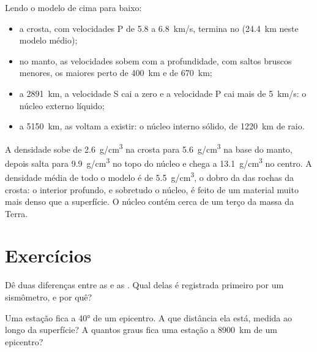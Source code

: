 Lendo o modelo de cima para baixo:
\begin{itemize}
  \item a crosta, com velocidades P de 5.8 a \qty{6.8}{km/s}, termina no
         (\qty{24.4}{km} neste modelo médio);
  \item no manto, as velocidades sobem com a profundidade, com saltos
        bruscos menores, os maiores perto de \qty{400}{km} e de
        \qty{670}{km};
  \item a \qty{2891}{km}, a velocidade S cai a zero e a velocidade P cai
        mais de \qty{5}{km/s}: o núcleo externo líquido;
  \item a \qty{5150}{km}, as  voltam a existir: o núcleo interno
        sólido, de \qty{1220}{km} de raio.
\end{itemize}

A densidade sobe de \qty{2.6}{g/cm^3} na crosta para \qty{5.6}{g/cm^3} na
base do manto, depois salta para \qty{9.9}{g/cm^3} no topo do núcleo e chega
a \qty{13.1}{g/cm^3} no centro. A densidade média de todo o modelo é de
\qty{5.5}{g/cm^3}, o dobro da das rochas da crosta: o interior profundo, e
sobretudo o núcleo, é feito de um material muito mais denso que a
superfície. O núcleo contém cerca de um terço da massa da Terra.

\section{Exercícios}

\begin{exercise}[$\star$]\label{exo:g11:seismic-structure:1}
Dê duas diferenças entre as  e as . Qual delas é registrada
primeiro por um sismômetro, e por quê?
\end{exercise}

\begin{exercise}[$\star$]\label{exo:g11:seismic-structure:2}
Uma estação fica a \ang{40} de um epicentro. A que distância ela está,
medida ao longo da superfície? A quantos graus fica uma estação a
\qty{8900}{km} de um epicentro?
\end{exercise}

